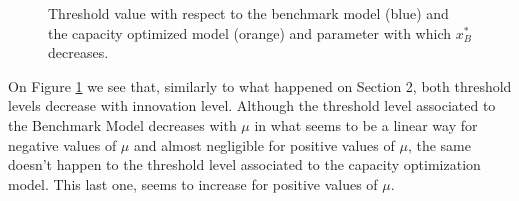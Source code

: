\begin{figure}[!htb]
	\begin{subfigmatrix}{2}
	\end{subfigmatrix}
	\caption{Threshold value with respect to the benchmark model (blue) and the capacity optimized model (orange) and parameter with which  $x^*_B$ decreases.}
	\label{fig:2_x3}
\end{figure}

On Figure \ref{fig:2_x3} we see that, similarly to what happened on Section 2, both threshold levels decrease with innovation level. Although the threshold level associated to the Benchmark Model decreases with $\mu$ in what seems to be a linear way for negative values of $\mu$ and almost negligible for positive values of $\mu$, the same doesn't happen to the threshold level associated to the capacity optimization model. This last one, seems to increase for positive values of $\mu$. 


